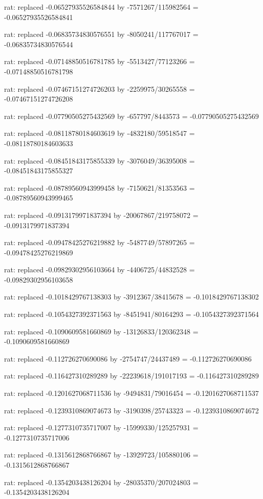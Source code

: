 \documentclass[a4paper,10pt]{article}
\begin{document}
\begin{eulernotebook}
\begin{eulercomment}
\begin{eulercomment}
\begin{eulercomment}
\begin{eulercomment}
\begin{eulercomment}
\begin{eulercomment}
\begin{eulercomment}
\begin{eulercomment}
\begin{eulercomment}
\begin{eulercomment}
\begin{eulercomment}
\begin{eulercomment}
\begin{eulercomment}
\begin{eulercomment}
\begin{eulercomment}
\begin{eulercomment}
\begin{euleroutput}
  rat: replaced -0.06527935526584844 by -7571267/115982564 = -0.06527935526584841
  
  rat: replaced -0.06835734830576551 by -8050241/117767017 = -0.06835734830576544
  
  rat: replaced -0.07148850516781785 by -5513427/77123266 = -0.07148850516781798
  
  rat: replaced -0.07467151274726203 by -2259975/30265558 = -0.07467151274726208
  
  rat: replaced -0.07790505275432569 by -657797/8443573 = -0.07790505275432569
  
  rat: replaced -0.08118780184603619 by -4832180/59518547 = -0.08118780184603633
  
  rat: replaced -0.08451843175855339 by -3076049/36395008 = -0.08451843175855327
  
  rat: replaced -0.08789560943999458 by -7150621/81353563 = -0.08789560943999465
  
  rat: replaced -0.0913179971837394 by -20067867/219758072 = -0.0913179971837394
  
  rat: replaced -0.09478425276219882 by -5487749/57897265 = -0.09478425276219869
  
  rat: replaced -0.09829302956103664 by -4406725/44832528 = -0.09829302956103658
  
  rat: replaced -0.1018429767138303 by -3912367/38415678 = -0.1018429767138302
  
  rat: replaced -0.1054327392371563 by -8451941/80164293 = -0.1054327392371564
  
  rat: replaced -0.1090609581660869 by -13126833/120362348 = -0.1090609581660869
  
  rat: replaced -0.112726270690086 by -2754747/24437489 = -0.112726270690086
  
  rat: replaced -0.116427310289289 by -22239618/191017193 = -0.116427310289289
  
  rat: replaced -0.1201627068711536 by -9494831/79016454 = -0.1201627068711537
  
  rat: replaced -0.1239310869074673 by -3190398/25743323 = -0.1239310869074672
  
  rat: replaced -0.1277310735717007 by -15999330/125257931 = -0.1277310735717006
  
  rat: replaced -0.1315612868766867 by -13929723/105880106 = -0.1315612868766867
  
  rat: replaced -0.1354203438126204 by -28035370/207024803 = -0.1354203438126204
  

\end{euleroutput}
\end{eulercomment}
\end{eulercomment}
\end{eulercomment}
\end{eulercomment}
\end{eulercomment}
\end{eulercomment}
\end{eulercomment}
\end{eulercomment}
\end{eulercomment}
\end{eulercomment}
\end{eulercomment}
\end{eulercomment}
\end{eulercomment}
\end{eulercomment}
\end{eulercomment}
\end{eulercomment}
\end{eulernotebook}
\end{document}
